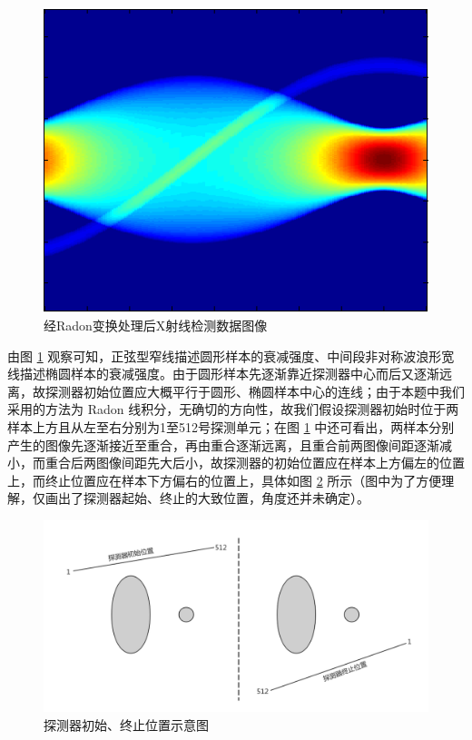 \documentclass[UTF8]{ctexart}
\begin{document}
\begin{figure}[htbp]
  \centering
  \includegraphics[width=5in]{../figure/matlab.png}
  \caption{经Radon变换处理后X射线检测数据图像}
  \label{fig:matlab}
\end{figure}

由图 \ref{fig:matlab} 观察可知，正弦型窄线描述圆形样本的衰减强度、中间段非对称波浪形宽线描述椭圆样本的衰减强度。由于圆形样本先逐渐靠近探测器中心而后又逐渐远离，故探测器初始位置应大概平行于圆形、椭圆样本中心的连线；由于本题中我们采用的方法为 Radon 线积分，无确切的方向性，故我们假设探测器初始时位于两样本上方且从左至右分别为1至512号探测单元；在图 \ref{fig:matlab} 中还可看出，两样本分别产生的图像先逐渐接近至重合，再由重合逐渐远离，且重合前两图像间距逐渐减小，而重合后两图像间距先大后小，故探测器的初始位置应在样本上方偏左的位置上，而终止位置应在样本下方偏右的位置上，具体如图 \ref{fig:position} 所示（图中为了方便理解，仅画出了探测器起始、终止的大致位置，角度还并未确定）。

\begin{figure}[htbp]
  \centering
  \includegraphics[width=6in]{../figure/position.png}
  \caption{探测器初始、终止位置示意图}
  \label{fig:position}
\end{figure}
\end{document}
